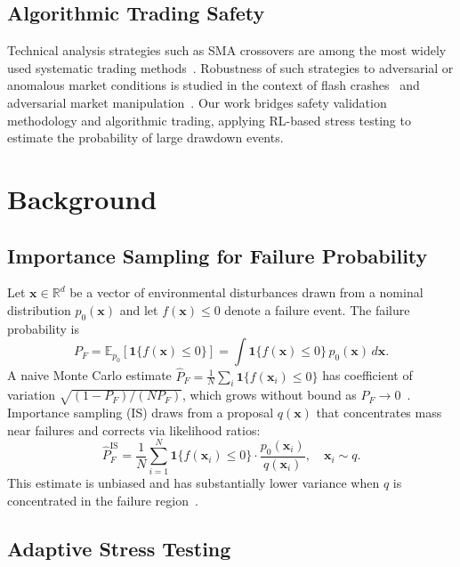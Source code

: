 \documentclass[conference]{IEEEtran}
\begin{document}
\subsection{Algorithmic Trading Safety}
Technical analysis strategies such as SMA crossovers are among the most
widely used systematic trading methods~\cite{brock1992sma}.
Robustness of such strategies to adversarial or anomalous market conditions
is studied in the context of flash crashes~\cite{kirilenko2017flash} and
adversarial market manipulation~\cite{brunnermeier2005predatory}.
Our work bridges safety validation methodology and algorithmic trading,
applying RL-based stress testing to estimate the probability of large
drawdown events.

\section{Background}

\subsection{Importance Sampling for Failure Probability}

Let $\mathbf{x} \in \mathbb{R}^d$ be a vector of environmental disturbances drawn
from a nominal distribution $p_0(\mathbf{x})$ and let $f(\mathbf{x}) \leq 0$ denote
a failure event. The failure probability is
\begin{equation}
  P_F = \mathbb{E}_{p_0}\!\left[\mathbf{1}\{f(\mathbf{x}) \leq 0\}\right]
      = \int \mathbf{1}\{f(\mathbf{x}) \leq 0\}\, p_0(\mathbf{x})\, d\mathbf{x}.
\end{equation}
A naive Monte Carlo estimate $\hat{P}_F = \frac{1}{N}\sum_i \mathbf{1}\{f(\mathbf{x}_i)\leq 0\}$
has coefficient of variation $\sqrt{(1-P_F)/(N P_F)}$, which grows
without bound as $P_F \to 0$~\cite{tokdar2010is}.
Importance sampling (IS) draws from a proposal $q(\mathbf{x})$ that concentrates
mass near failures and corrects via likelihood ratios:
\begin{equation}
  \hat{P}_F^{\text{IS}} = \frac{1}{N}\sum_{i=1}^{N}
    \mathbf{1}\{f(\mathbf{x}_i)\leq 0\}\cdot\frac{p_0(\mathbf{x}_i)}{q(\mathbf{x}_i)},
    \quad \mathbf{x}_i \sim q.
\end{equation}
This estimate is unbiased and has substantially lower variance when $q$ is
concentrated in the failure region~\cite{corso2021survey}.

\subsection{Adaptive Stress Testing}
\end{document}
